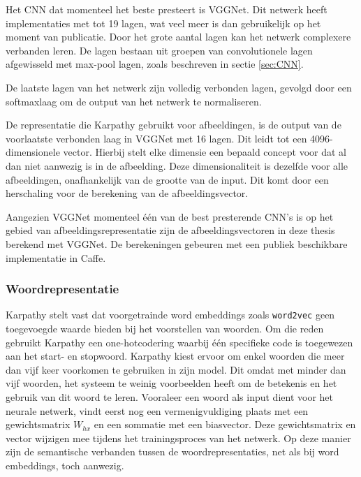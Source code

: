 Het CNN dat momenteel het beste presteert is VGGNet\cite{Arge2015}. Dit netwerk heeft implementaties met tot 19 lagen, wat veel meer is dan gebruikelijk op het moment van publicatie. Door het grote aantal lagen kan het netwerk complexere verbanden leren. De lagen bestaan uit groepen van convolutionele lagen afgewisseld met max-pool lagen, zoals beschreven in sectie \ref{sec:CNN}.

De laatste lagen van het netwerk zijn volledig verbonden lagen, gevolgd door een softmaxlaag om de output van het netwerk te normaliseren. 

De representatie die Karpathy gebruikt voor afbeeldingen, is de output van de voorlaatste verbonden laag in VGGNet met 16 lagen. Dit leidt tot een 4096-dimensionele vector. Hierbij stelt elke dimensie een bepaald concept voor dat al dan niet aanwezig is in de afbeelding. Deze dimensionaliteit is dezelfde voor alle afbeeldingen, onafhankelijk van de grootte van de input. Dit komt door een herschaling voor de berekening van de afbeeldingsvector.

Aangezien VGGNet momenteel \'e\'en van de best presterende CNN's is op het gebied van afbeeldingsrepresentatie zijn de afbeeldingsvectoren in deze thesis berekend met VGGNet. De berekeningen gebeuren met een publiek beschikbare implementatie in Caffe\cite{Jia2014}.

\subsubsection{Woordrepresentatie}
Karpathy\cite{Karpathy2015} stelt vast dat voorgetrainde word embeddings zoals \texttt{word2vec} geen toegevoegde waarde bieden bij het voorstellen van woorden. Om die reden gebruikt Karpathy een one-hotcodering waarbij \'e\'en specifieke code is toegewezen aan het start- en stopwoord. Karpathy kiest ervoor om enkel woorden die meer dan vijf keer voorkomen te gebruiken in zijn model. Dit omdat met minder dan vijf woorden, het systeem te weinig voorbeelden heeft om de betekenis en het gebruik van dit woord te leren. Vooraleer een woord als input dient voor het neurale netwerk, vindt eerst nog een vermenigvuldiging plaats met een gewichtsmatrix $W_{hx}$ en een sommatie met een biasvector. Deze gewichtsmatrix en vector wijzigen mee tijdens het trainingsproces van het netwerk. Op deze manier zijn de semantische verbanden tussen de woordrepresentaties, net als bij word embeddings, toch aanwezig.

